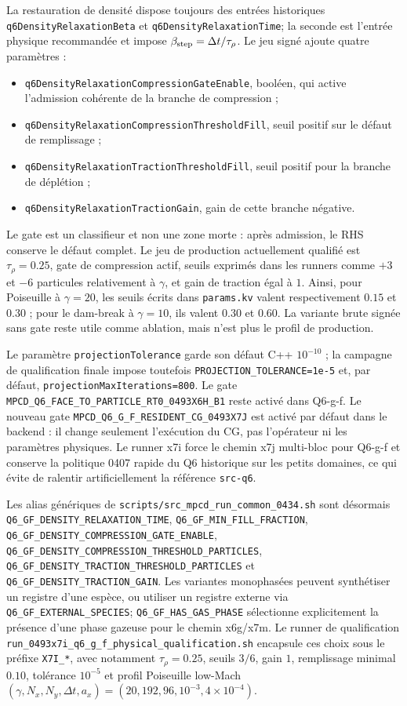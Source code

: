 \documentclass[11pt,a4paper]{article}
\begin{document}
La restauration de densité dispose toujours des entrées historiques \texttt{q6DensityRelaxationBeta} et \texttt{q6DensityRelaxationTime}; la seconde est l'entrée physique recommandée et impose $\beta_{\rm step}=\Delta t/\tau_\rho$. Le jeu signé ajoute quatre paramètres :
\begin{itemize}[leftmargin=2em]
  \item \texttt{q6DensityRelaxationCompressionGateEnable}, booléen, qui active l'admission cohérente de la branche de compression ;
  \item \texttt{q6DensityRelaxationCompressionThresholdFill}, seuil positif sur le défaut de remplissage ;
  \item \texttt{q6DensityRelaxationTractionThresholdFill}, seuil positif pour la branche de déplétion ;
  \item \texttt{q6DensityRelaxationTractionGain}, gain de cette branche négative.
\end{itemize}
Le gate est un classifieur et non une zone morte : après admission, le RHS conserve le défaut complet. Le jeu de production actuellement qualifié est $\tau_\rho=0.25$, gate de compression actif, seuils exprimés dans les runners comme $+3$ et $-6$ particules relativement à $\gamma$, et gain de traction égal à $1$. Ainsi, pour Poiseuille à $\gamma=20$, les seuils écrits dans \texttt{params.kv} valent respectivement $0.15$ et $0.30$ ; pour le dam-break à $\gamma=10$, ils valent $0.30$ et $0.60$. La variante brute signée sans gate reste utile comme ablation, mais n'est plus le profil de production.

Le paramètre \texttt{projectionTolerance} garde son défaut C++ $10^{-10}$ ; la campagne de qualification finale impose toutefois \texttt{PROJECTION\_TOLERANCE=1e-5} et, par défaut, \texttt{projectionMaxIterations=800}. Le gate \texttt{MPCD\_Q6\_FACE\_TO\_PARTICLE\_RT0\_0493X6H\_B1} reste activé dans Q6-g-f. Le nouveau gate \texttt{MPCD\_Q6\_G\_F\_RESIDENT\_CG\_0493X7J} est activé par défaut dans le backend : il change seulement l'exécution du CG, pas l'opérateur ni les paramètres physiques. Le runner x7i force le chemin x7j multi-bloc pour Q6-g-f et conserve la politique 0407 rapide du Q6 historique sur les petits domaines, ce qui évite de ralentir artificiellement la référence \texttt{src-q6}.

Les alias génériques de \texttt{scripts/src\_mpcd\_run\_common\_0434.sh} sont désormais \texttt{Q6\_GF\_DENSITY\_RELAXATION\_TIME}, \texttt{Q6\_GF\_MIN\_FILL\_FRACTION}, \texttt{Q6\_GF\_DENSITY\_COMPRESSION\_GATE\_ENABLE}, \texttt{Q6\_GF\_DENSITY\_COMPRESSION\_THRESHOLD\_PARTICLES}, \texttt{Q6\_GF\_DENSITY\_TRACTION\_THRESHOLD\_PARTICLES} et \texttt{Q6\_GF\_DENSITY\_TRACTION\_GAIN}. Les variantes monophasées peuvent synthétiser un registre d'une espèce, ou utiliser un registre externe via \texttt{Q6\_GF\_EXTERNAL\_SPECIES}; \texttt{Q6\_GF\_HAS\_GAS\_PHASE} sélectionne explicitement la présence d'une phase gazeuse pour le chemin x6g/x7m. Le runner de qualification \texttt{run\_0493x7i\_q6\_g\_f\_physical\_qualification.sh} encapsule ces choix sous le préfixe \texttt{X7I\_*}, avec notamment $\tau_\rho=0.25$, seuils $3/6$, gain $1$, remplissage minimal $0.10$, tolérance $10^{-5}$ et profil Poiseuille low-Mach $(\gamma,N_x,N_y,\Delta t,a_x)=(20,192,96,10^{-3},4\times10^{-4})$.
\end{document}
